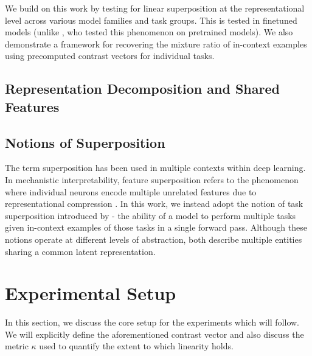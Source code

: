 \documentclass[11pt]{article}
\begin{document}
We build on this work by testing for linear superposition at the representational level across various model families and task groups. This is tested in finetuned models (unlike \citet{xiong2024oncellmsincontextlearn}, who tested this phenomenon on pretrained models). We also demonstrate a framework for recovering the mixture ratio of in-context examples using precomputed contrast vectors for individual tasks.
\subsection*{Representation Decomposition and Shared Features}
\subsection*{Notions of Superposition}
The term superposition has been used in multiple contexts within deep learning. In mechanistic interpretability, feature superposition refers to the phenomenon where individual neurons encode multiple unrelated features due to representational compression \citep{elhage2022toymodelssuperposition}. In this work, we instead adopt the notion of task superposition introduced by \citet{xiong2024oncellmsincontextlearn}- the ability of a model to perform multiple tasks given in-context examples of those tasks in a single forward pass. Although these notions operate at different levels of abstraction, both describe multiple entities sharing a common latent representation.

\section{Experimental Setup}
In this section, we discuss the core setup for the experiments which will follow. We will explicitly define the aforementioned contrast vector and also discuss the metric \(\kappa\) used to quantify the extent to which linearity holds.
\end{document}
